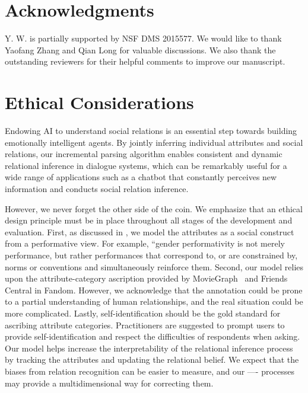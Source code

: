 \documentclass[11pt,a4paper]{article}
\begin{document}
\section*{Acknowledgments}
Y. W. is partially supported by NSF DMS 2015577. We would like to thank Yaofang Zhang and Qian Long for valuable discussions. We also thank the outstanding reviewers for their helpful comments to improve our manuscript. 

\section*{Ethical Considerations}
Endowing AI to understand social relations is an essential step towards building emotionally intelligent agents. By jointly inferring individual attributes and social relations, our incremental parsing algorithm enables consistent and dynamic relational inference in dialogue systems, which can be remarkably useful for a wide range of applications such as a chatbot that constantly perceives new information and conducts social relation inference. 

However, we never forget the other side of the coin. We emphasize that an ethical design principle must be in place throughout all stages of the development and evaluation. First, as discussed in \citet{larson-2017-gender}, we model the attributes as a social construct from a performative view. For example, ``gender performativity is not merely performance, but rather performances that correspond to, or are constrained by, norms or conventions and simultaneously reinforce them. Second, our model relies upon the attribute-category ascription provided by MovieGraph~\citep{vicol2018moviegraphs} and Friends Central in Fandom. However, we acknowledge that the annotation could be prone to a partial understanding of human relationships, and the real situation could be more complicated. Lastly, self-identification should be the gold standard for ascribing attribute categories. Practitioners are suggested to prompt users to provide self-identification and respect the difficulties of respondents when asking. Our model helps increase the interpretability of the relational inference process by tracking the attributes and updating the relational belief. We expect that the biases from relation recognition can be easier to measure, and our ---- processes may provide a multidimensional way for correcting them.




\appendix
\end{document}
